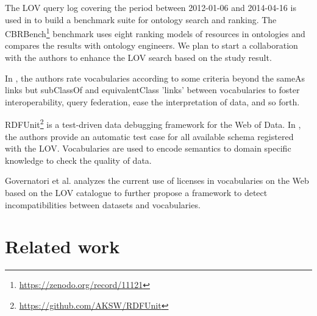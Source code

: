 \documentclass{iosart2c}
\newcommand{\ghis}[1]{\textcolor{brown}{\textbf{[GHIS TO:#1]}}}
\begin{document}
The LOV query log covering the period between 2012-01-06 and 2014-04-16 is used in \cite{butt2014} to build a benchmark suite for ontology search and ranking. The CBRBench\footnote{\url{https://zenodo.org/record/11121}} benchmark uses eight ranking models of resources in ontologies and compares the results with ontology engineers. We plan to start a collaboration with the authors to enhance the LOV search based on the study result.

In \cite{janowicz2014five}, the authors rate vocabularies according to some criteria beyond the sameAs links but subClassOf and equivalentClass 'links' between vocabularies to foster interoperability, query federation, ease the interpretation of data, and so forth. %

RDFUnit\footnote{\url{https://github.com/AKSW/RDFUnit}} is a test-driven data debugging framework for the Web of Data. In \cite{rdfunit}, the authors provide an automatic test case for all available schema registered with the LOV. Vocabularies are used to encode semantics to domain specific knowledge to check the quality of data.

Governatori et al. \cite{governatori2014} analyzes the current use of licenses in vocabularies on the Web based on the LOV catalogue to further propose a framework to detect incompatibilities between datasets and vocabularies.


\section{Related work}
\label{sec:related}
\end{document}
